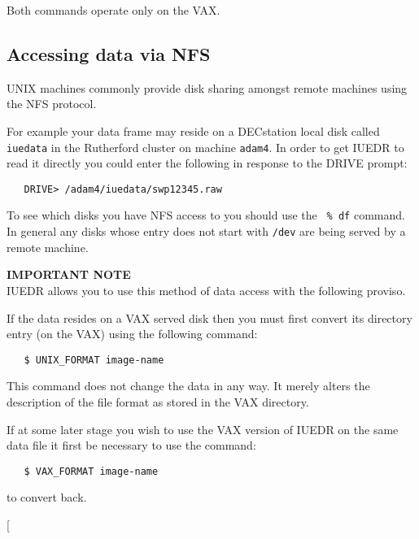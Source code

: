 Both commands operate only on the VAX.

\subsection{\label{se:nfs}Accessing data via NFS}

UNIX machines commonly provide disk sharing amongst remote machines
using the NFS protocol.

For example your data frame may reside on a DECstation local  disk
called \verb+iuedata+ in the Rutherford cluster on machine \verb+adam4+\@. In
order to get IUEDR to read it directly you could enter the following
in response to the DRIVE prompt:

\begin{verbatim}
   DRIVE> /adam4/iuedata/swp12345.raw
\end{verbatim}

To see which disks you have NFS access to you should use the {\tt
\%~df} command. In general any disks whose entry does not start with
\verb+/dev+ are being served by a remote machine.

{\bf IMPORTANT NOTE\\}
IUEDR allows you to use this method of data access with the following proviso.

If the data resides on a VAX served disk then you must first  convert
its directory entry (on the VAX) using the following command:

\begin{verbatim}
   $ UNIX_FORMAT image-name
\end{verbatim}

This command does not change the data in any way.  It merely alters the
description of the file format as stored in the VAX directory.

If at some later stage you wish to use the VAX version of IUEDR on the
same data file it first be necessary to use the command:

\begin{verbatim}
   $ VAX_FORMAT image-name
\end{verbatim}

to convert back.

\twocolumn[
